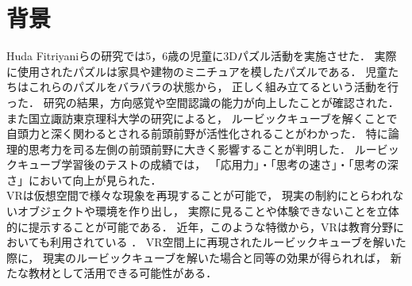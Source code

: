 \section{背景}
  Huda Fitriyaniらの研究\cite{puzzle}では5，6歳の児童に3Dパズル活動を実施させた．
  実際に使用されたパズルは家具や建物のミニチュアを模したパズルである．
  児童たちはこれらのパズルをバラバラの状態から，
  正しく組み立てるという活動を行った．
  研究の結果，方向感覚や空間認識の能力が向上したことが確認された．
  また国立諏訪東京理科大学の研究\cite{rubik}によると，
  ルービックキューブを解くことで
  自頭力と深く関わるとされる前頭前野が活性化されることがわかった．
  特に論理的思考力を司る左側の前頭前野に大きく影響することが判明した．
  ルービックキューブ学習後のテストの成績では，
  「応用力」・「思考の速さ」・「思考の深さ」において向上が見られた．
  \\\indent
  VRは仮想空間で様々な現象を再現することが可能で，
  現実の制約にとらわれないオブジェクトや環境を作り出し，
  実際に見ることや体験できないことを立体的に提示することが可能である．
  近年，このような特徴から，VRは教育分野においても利用されている
  \cite{全天球}\cite{授業実践}．
  VR空間上に再現されたルービックキューブを解いた際に，
  現実のルービックキューブを解いた場合と同等の効果が得られれば，
  新たな教材として活用できる可能性がある．
